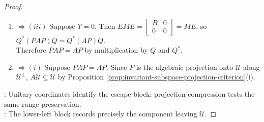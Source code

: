\begin{theorem}
\begin{proof}
\begin{enumerate}[label=(\roman*)]
Since the columns of $Q_2$ span $\mathcal{U}^{\perp}$, $Y=Q_2^*AQ_1=0$.
\item[$(ii)$] $\Rightarrow (iii)$ Suppose $Y=0$. Then $EME=\left[\begin{smallmatrix}B&0\\0&0\end{smallmatrix}\right]=ME$, so $Q^*(PAP)Q=Q^*(AP)Q$.\\
Therefore $PAP=AP$ by multiplication by $Q$ and $Q^*$.
\item[$(iii)$] $\Rightarrow (i)$ Suppose $PAP=AP$. Since $P$ is the algebraic projection onto $\mathcal{U}$ along $\mathcal{U}^{\perp}$, $A\mathcal{U}\subseteq\mathcal{U}$ by Proposition \ref{prop:invariant-subspace-projection-criterion}(i).
\end{enumerate}
: Unitary coordinates identify the escape block; projection compression tests the same range preservation.\\
: The lower-left block records precisely the component leaving $\mathcal{U}$.
\end{proof}
\end{theorem}

